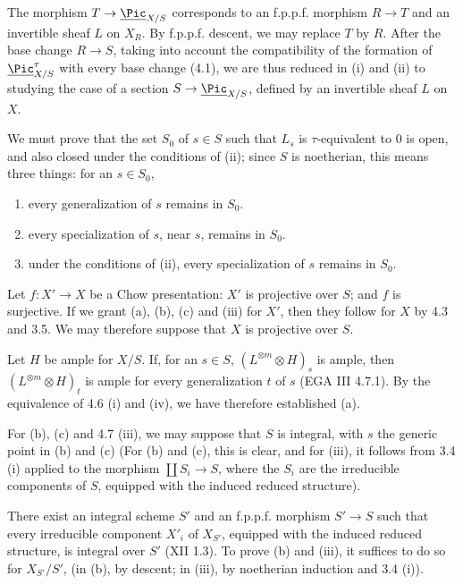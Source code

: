 The morphism \(T\to\underline{\Pic}_{X/S}\) corresponds to an f.p.p.f. morphism \(R\to T\) and an invertible sheaf \(L\) on \(X_R\). By f.p.p.f. descent, we may replace \(T\) by \(R\). After the base change \(R\to S\), taking into account the compatibility of the formation of \(\underline{\Pic}^\tau_{X/S}\) with every base change (4.1), we are thus reduced in (i) and (ii) to studying the case of a section \(S\to\underline{\Pic}_{X/S}\), defined by an invertible sheaf \(L\) on \(X\).

We must prove that the set \(S_0\) of \(s\in S\) such that \(L_s\) is \(\tau\)-equivalent to \(0\) is open, and also closed under the conditions of (ii); since \(S\) is noetherian, this means three things: for an \(s\in S_0\),
\begin{enumerate}[label=(\alph*)]
\item every generalization of \(s\) remains in \(S_0\).
\item every specialization of \(s\), near \(s\), remains in \(S_0\).
\item under the conditions of (ii), every specialization of \(s\) remains in \(S_0\).
\end{enumerate}

%
Let \(f:X'\to X\) be a Chow presentation: \(X'\) is projective over \(S\); and \(f\) is surjective. If we grant (a), (b), (c) and (iii) for \(X'\), then they follow for \(X\) by 4.3 and 3.5. We may therefore suppose that \(X\) is projective over \(S\).

Let \(H\) be ample for \(X/S\). If, for an \(s\in S\), \((L^{\otimes m}\otimes H)_s\) is ample, then \((L^{\otimes m}\otimes H)_t\) is ample for every generalization \(t\) of \(s\) (EGA III 4.7.1). By the equivalence of 4.6 (i) and (iv), we have therefore established (a).

For (b), (c) and 4.7 (iii), we may suppose that \(S\) is integral, with \(s\) the generic point in (b) and (c) (For (b) and (c), this is clear, and for (iii), it follows from 3.4 (i) applied to the morphism \(\coprod S_i\to S\), where the \(S_i\) are the irreducible components of \(S\), equipped with the induced reduced structure).

There exist an integral scheme \(S'\) and an f.p.p.f. morphism \(S'\to S\) such that every irreducible component \(X'_i\) of \(X_{S'}\), equipped with the induced reduced structure, is integral over \(S'\) (XII 1.3). To prove (b) and (iii), it suffices to do so for \(X_{S'}/S'\), (in (b), by descent; in (iii), by noetherian induction and 3.4 (i)).

